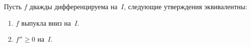 
    Пусть $f$ дважды дифференцируема на~$I$, следующие утверждения эквивалентны:

    \begin{enumerate}
        \item $f$ выпукла вниз на~$I$.

        \item $f''\geq0$ на~$I$.
    \end{enumerate}
